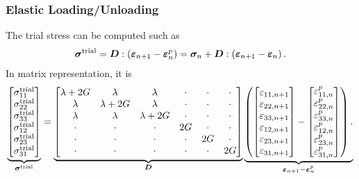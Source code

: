 \subsubsection{Elastic Loading/Unloading}
The trial stress can be computed such as
\begin{gather}\label{eq:j2_tsigma}
    \bm{\sigma}^\text{trial}=\bm{D}:\left(\bm{\varepsilon}_{n+1}-\bm{\varepsilon}^p_n\right)=\bm{\sigma}_n+\bm{D}:\left(\bm{\varepsilon}_{n+1}-\bm{\varepsilon}_n\right).
\end{gather}
In matrix representation, it is
\begin{gather}
    \underbrace{
        \begin{bmatrix}
            \sigma^\text{trial}_{11} \\
            \sigma^\text{trial}_{22} \\
            \sigma^\text{trial}_{33} \\
            \sigma^\text{trial}_{12} \\
            \sigma^\text{trial}_{23} \\
            \sigma^\text{trial}_{31}
        \end{bmatrix}}_{\bm{\sigma}^\text{trial}}
    =
    \underbrace{\begin{bmatrix}
            \lambda+2G & \lambda    & \lambda    & \cdot & \cdot & \cdot \\
            \lambda    & \lambda+2G & \lambda    & \cdot & \cdot & \cdot \\
            \lambda    & \lambda    & \lambda+2G & \cdot & \cdot & \cdot \\
            \cdot      & \cdot      & \cdot      & 2G    & \cdot & \cdot \\
            \cdot      & \cdot      & \cdot      & \cdot & 2G    & \cdot \\
            \cdot      & \cdot      & \cdot      & \cdot & \cdot & 2G
        \end{bmatrix}}_{\bm{D}}
    \underbrace{\left(\begin{bmatrix}
            \varepsilon_{11,n+1} \\
            \varepsilon_{22,n+1} \\
            \varepsilon_{33,n+1} \\
            \varepsilon_{12,n+1} \\
            \varepsilon_{23,n+1} \\
            \varepsilon_{31,n+1}
        \end{bmatrix}-\begin{bmatrix}
            \varepsilon^p_{11,n} \\
            \varepsilon^p_{22,n} \\
            \varepsilon^p_{33,n} \\
            \varepsilon^p_{12,n} \\
            \varepsilon^p_{23,n} \\
            \varepsilon^p_{31,n}
        \end{bmatrix}
        \right).}_{\bm{\varepsilon}_{n+1}-\bm{\varepsilon}^p_n}
\end{gather}
